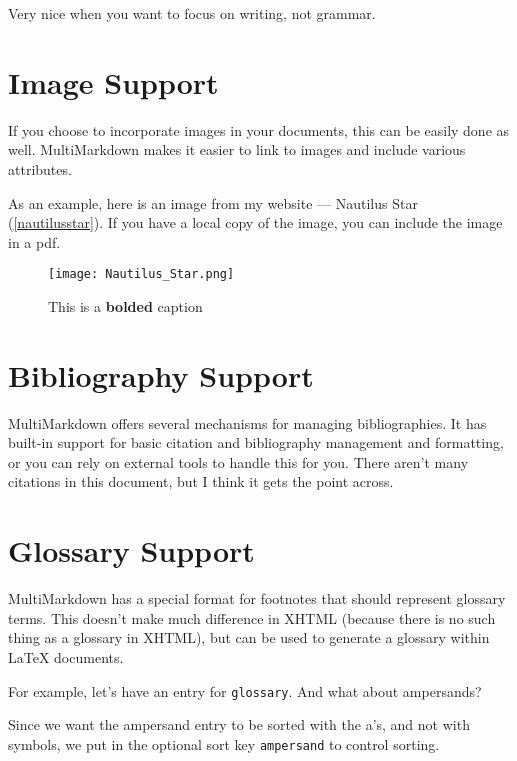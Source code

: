 Very nice when you want to focus on writing, not grammar.

\section{Image Support}
\label{imagesupport}

If you choose to incorporate images in your documents, this can be easily done
as well. MultiMarkdown makes it easier to link to images and include various
attributes.

As an example, here is an image from my website --- Nautilus
Star (\autoref{nautilusstar}). If you have a local copy of the image, you can include
the image in a pdf.

\begin{figure}[htbp]
\centering
\texttt{[image: Nautilus\_Star.png]}
\caption{This is a \textbf{bolded} caption}
\label{nautilusstar}
\end{figure}

\section{Bibliography Support}
\label{bibliographysupport}

MultiMarkdown offers several mechanisms for managing bibliographies. It has
built-in support for basic citation and bibliography management and
formatting, or you can rely on external tools to handle this for you. There
aren't many citations in this document, but I think it gets the point
across.~\citep[p. 42]{fake}

\section{Glossary Support}
\label{glossarysupport}

MultiMarkdown has a special format for footnotes that should represent
glossary terms. This doesn't make much difference in XHTML (because there is
no such thing as a glossary in XHTML), but can be used to generate a glossary
within LaTeX documents.

For example, let's have an entry for \texttt{glossary}. And what about
ampersands?\glsadd{& }

Since we want the ampersand entry to be sorted with the a's, and not with
symbols, we put in the optional sort key \texttt{ampersand} to control sorting.

